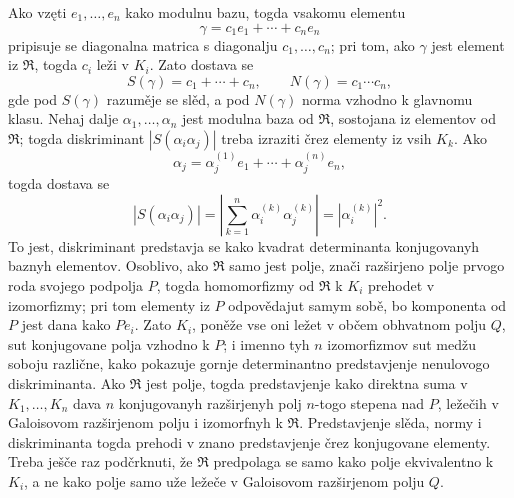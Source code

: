 \documentclass[11pt]{article}
\begin{document}
\setcounter{footnote}{27}

Ako vzęti $e_1,\ldots,e_n$ kako modulnu bazu, togda vsakomu elementu
\[
        \gamma=c_1e_1+\cdots+c_ne_n
\]
pripisuje se diagonalna matrica s diagonalju $c_1,\ldots,c_n$; pri tom, ako $\gamma$ jest element iz $\mathfrak R$, togda $c_i$ leži v $K_i$. Zato dostava se
\[
        S(\gamma)=c_1+\cdots+c_n,
        \qquad
        N(\gamma)=c_1\cdots c_n,
\]
gde pod $S(\gamma)$ razuměje se slěd, a pod $N(\gamma)$ norma vzhodno k glavnomu klasu. Nehaj dalje $\alpha_1,\ldots,\alpha_n$ jest modulna baza od $\mathfrak R$, sostojana iz elementov od $\mathfrak R$; togda diskriminant $|S(\alpha_i\alpha_j)|$ treba izraziti črez elementy iz vsih $K_k$. Ako
\[
        \alpha_j=\alpha_j^{(1)}e_1+\cdots+\alpha_j^{(n)}e_n,
\]
togda dostava se
\[
        |S(\alpha_i\alpha_j)|
        =
        \left|\sum_{k=1}^n \alpha_i^{(k)}\alpha_j^{(k)}\right|
        =
        \left|\alpha_i^{(k)}\right|^2.
\]
To jest, diskriminant predstavja se kako kvadrat determinanta konjugovanyh baznyh elementov. Osoblivo, ako $\mathfrak R$ samo jest polje, znači razširjeno polje prvogo roda svojego podpolja $P$, togda homomorfizmy od $\mathfrak R$ k $K_i$ prehodet v izomorfizmy; pri tom elementy iz $P$ odpovědajut samym sobě, bo komponenta od $P$ jest dana kako $P e_i$. Zato $K_i$, poněže vse oni ležet v občem obhvatnom polju $Q$, sut konjugovane polja vzhodno k $P$; i imenno tyh $n$ izomorfizmov sut medžu soboju različne, kako pokazuje gornje determinantno predstavjenje nenulovogo diskriminanta. Ako $\mathfrak R$ jest polje, togda predstavjenje kako direktna suma v $K_1,\ldots,K_n$ dava $n$ konjugovanyh razširjenyh polj $n$-togo stepena nad $P$, ležečih v Galoisovom razširjenom polju i izomorfnyh k $\mathfrak R$. Predstavjenje slěda, normy i diskriminanta togda prehodi v znano predstavjenje črez konjugovane elementy. Treba ješče raz podčrknuti, že $\mathfrak R$ predpolaga se samo kako polje ekvivalentno k $K_i$, a ne kako polje samo uže ležeče v Galoisovom razširjenom polju $Q$.
\end{document}
